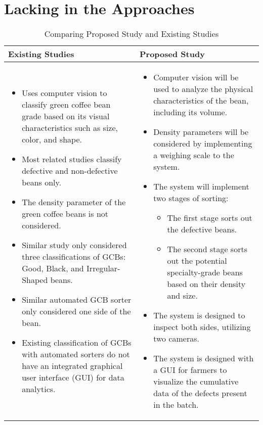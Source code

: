 \section{Lacking in the Approaches}

\begin{center}
	\scriptsize{
	\begin{longtable}{| p{7cm} | p{7cm} |}
		\caption{Comparing Proposed Study and Existing Studies} 
		\label{tab:comparing_study}
		\endfirsthead
		\endhead
		\hline
		
		\textbf{Existing Studies} & \textbf{Proposed Study} \\ 
		\hline
		\begin{itemize}
			\item Uses computer vision to classify green coffee bean grade based on its visual characteristics such as size, color, and shape.
			\item Most related studies classify defective and non-defective beans only.
			\item The density parameter of the green coffee beans is not considered.
			\item Similar study \cite{Lualhati_Mariano_Torres_Fenol_2022} only considered three classifications of GCBs: Good, Black, and Irregular-Shaped beans.
			\item Similar automated GCB sorter \cite{Balay_Cabrera_Jensen_Mayuga_2024} only considered one side of the bean.
			\item Existing classification of GCBs with automated sorters do not have an integrated graphical user interface (GUI) for data analytics.
		\end{itemize}
		&
		\begin{itemize}
			\item Computer vision will be used to analyze the physical characteristics of the bean, including its volume.
			\item Density parameters will be considered by implementing a weighing scale to the system.
			\item The system will implement two stages of sorting:
			\begin{itemize}
				\item The first stage sorts out the defective beans.
				\item The second stage sorts out the potential specialty-grade beans based on their density and size.
			\end{itemize}
			\item The system is designed to inspect both sides, utilizing two cameras.
			\item The system is designed with a GUI for farmers to visualize the cumulative data of the defects present in the batch.
		\end{itemize}
		\\ \hline			
	\end{longtable}
	}
\end{center}

